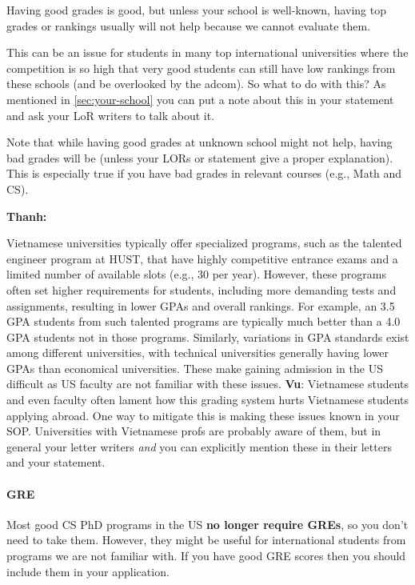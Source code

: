 \documentclass[oneside,11pt]{memoir}
\newenvironment{commentbox}[1][]{
  \small
  \begin{mybox}
    {\small \textbf{#1}}
  }{
  \end{mybox}
}
\newcommand{\red}[1]{{\color{red}{#1}}}
\begin{document}
Having good grades is good, but unless your school is well-known, having top grades or rankings
usually will not help because we cannot evaluate them.

This can be an issue for students in many top international universities where the competition is so high that very good students can still have low rankings from these schools (and be overlooked by the adcom).
So what to do with this? As mentioned in \autoref{sec:your-school} you can put a note about this in your statement and ask your LoR writers to talk about it.

Note that while having good grades at unknown school might not help,
having bad grades will be \red{red flag} (unless your LORs or
statement give a proper explanation). This is especially true if you
have bad grades in relevant courses (e.g., Math and CS).

\begin{commentbox}[Thanh:]
  Vietnamese universities typically offer specialized programs, such as the talented engineer program at HUST, that have highly competitive entrance exams and a limited number of available slots (e.g., 30 per year). However, these programs often set higher requirements for students, including more demanding tests and assignments, resulting in lower GPAs and overall rankings. For example, an 3.5 GPA students from such talented programs are typically much better than a 4.0 GPA students not in those programs.  Similarly, variations in GPA standards exist among different universities, with technical universities generally having lower GPAs than economical universities. These make gaining admission in the US difficult as US faculty are not familiar with these issues.
  \tcblower
  \textbf{Vu}: Vietnamese students and even faculty often lament how this grading system hurts Vietnamese students applying abroad. One way to mitigate this is making these issues known in your SOP.  Universities with Vietnamese profs are probably aware of them, but in general your letter writers \emph{and} you can explicitly mention these in their letters and your statement.
\end{commentbox}

\paragraph{GRE} Most good CS PhD programs in the US \textbf{no longer require GREs}, so you don't need to take them. However, they might be useful for international students from programs we are not familiar with.  If you have good GRE scores then you should include them in your application.
\end{document}
